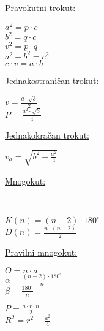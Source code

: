 \documentclass[9pt,oneside,a4paper]{report}
\begin{document}
\vspace{3mm}
\noindent
\begin{minipage}[t]{55mm}
	\underline{Pravokutni trokut:}

	\vspace{2mm}

	\noindent
	$a^2=p\cdot c$\\
	$b^2=q\cdot c$\\
	$v^2=p\cdot q$\\
	$a^2+b^2=c^2$\\
	$c\cdot v=a\cdot b$
\end{minipage}
\begin{minipage}[t]{55mm}
	\underline{Jednakostrani\v{c}an trokut:}

	\vspace{2mm}

	\noindent
	$\displaystyle v=\frac{a\cdot \sqrt 3}2$\\
	$\displaystyle P=\frac{a^2\cdot \sqrt 3}4$
\end{minipage}
\begin{minipage}[t]{55mm}
	\underline{Jednakokra\v{c}an trokut:}

	\vspace{2mm}

	\noindent
	$\displaystyle v_a=\sqrt{b^2-\frac{a^2}4}$
\end{minipage}

\newpage
\noindent
\begin{minipage}[t]{40mm}
	\noindent
	\underline{Mnogokut:}

	\vspace{2mm}
	\noindent
	\\
\end{minipage}
\begin{minipage}[t]{38mm}
	\vspace*{20mm}
	$\displaystyle K(n)=(n-2)\cdot 180^\circ$\\
	$\displaystyle D(n)=\frac{n\cdot (n-2)}2$
\end{minipage}
\begin{minipage}[t]{42mm}
	\noindent
	\underline{Pravilni mnogokut:}

	\vspace{2mm}
	\noindent
\end{minipage}
\begin{minipage}[t]{40mm}
	\vspace*{7mm}
	$\displaystyle O=n\cdot a$\\
	$\displaystyle \alpha=\frac{(n-2)\cdot 180^\circ}n$\\
	$\displaystyle \beta=\frac{180^\circ}n$

	\vspace{1mm}
	\noindent
	$\displaystyle P=\frac{a\cdot r\cdot n}2$\\
	$\displaystyle R^2=r^2+\frac{a^2}4$
\end{minipage}
\end{document}
